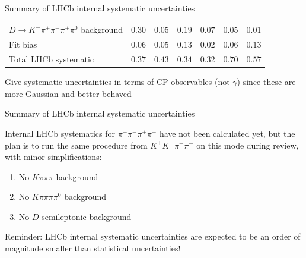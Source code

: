 \documentclass[xcolor={dvipsnames}]{beamer}
\begin{document}
\begin{frame}{Summary of LHCb internal systematic uncertainties}
\begin{center}
\begin{tabular}{lcccccc}
        $D\to K^-\pi^+\pi^-\pi^+\pi^0$ background                  & $0.30$ & $0.05$ & $0.19$ & $0.07$ & $0.05$ & $0.01$ \\
        Fit bias                                                   & $0.06$ & $0.05$ & $0.13$ & $0.02$ & $0.06$ & $0.13$ \\
        \hline
        Total LHCb systematic                                      & $0.37$ & $0.43$ & $0.34$ & $0.32$ & $0.70$ & $0.57$ \\
        \hline
    \end{tabular}
  \end{center}
  \begin{center}
    {\normalsize Give systematic uncertainties in terms of CP observables (not $\gamma$) since these are more Gaussian and better behaved}
  \end{center}
\end{frame}

\begin{frame}{Summary of LHCb internal systematic uncertainties}
  \begin{center}
    Internal LHCb systematics for $\pi^+\pi^-\pi^+\pi^-$ have not been calculated yet, but the plan is to run the same procedure from $K^+K^-\pi^+\pi^-$ on this mode during review, with minor simplifications:
  \end{center}
  \begin{enumerate}
    \setlength\itemsep{1.5em}
    \item{No $K\pi\pi\pi$ background}
    \item{No $K\pi\pi\pi\pi^0$ background}
    \item{No $D$ semileptonic background}
  \end{enumerate}
  \vspace{0.2cm}
  \begin{center}
    Reminder: LHCb internal systematic uncertainties are expected to be an order of magnitude smaller than statistical uncertainties!
  \end{center}
\end{frame}
\end{document}
